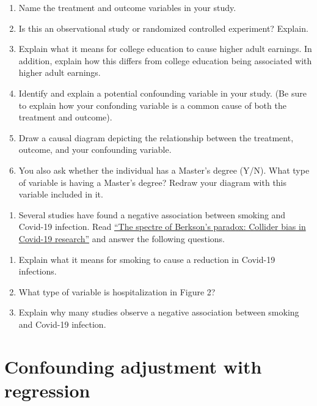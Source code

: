 \documentclass[
]{book}
\providecommand{\tightlist}{%
  \setlength{\itemsep}{0pt}\setlength{\parskip}{0pt}}
\begin{document}
\begin{enumerate}
\def\labelenumi{\alph{enumi})}
\item
  Name the treatment and outcome variables in your study.
\item
  Is this an observational study or randomized controlled experiment? Explain.
\item
  Explain what it means for college education to cause higher adult earnings. In addition, explain how this differs from college education being associated with higher adult earnings.
\item
  Identify and explain a potential confounding variable in your study. (Be sure to explain how your confonding variable is a common cause of both the treatment and outcome).
\item
  Draw a causal diagram depicting the relationship between the treatment, outcome, and your confounding variable.
\item
  You also ask whether the individual has a Master's degree (Y/N). What type of variable is having a Master's degree? Redraw your diagram with this variable included in it.
\end{enumerate}

\begin{enumerate}
\def\labelenumi{\arabic{enumi}.}
\setcounter{enumi}{1}
\tightlist
\item
  Several studies have found a negative association between smoking and Covid-19 infection. Read \href{https://rss.onlinelibrary.wiley.com/doi/10.1111/1740-9713.01413}{``The spectre of Berkson's paradox: Collider bias in Covid-19 research''} and answer the following questions.
\end{enumerate}

\begin{enumerate}
\def\labelenumi{\alph{enumi})}
\item
  Explain what it means for smoking to cause a reduction in Covid-19 infections.
\item
  What type of variable is hospitalization in Figure 2?
\item
  Explain why many studies observe a negative association between smoking and Covid-19 infection.
\end{enumerate}

\hypertarget{confounding-adjustment-with-regression}{%
\chapter{Confounding adjustment with regression}\label{confounding-adjustment-with-regression}}
\end{document}
